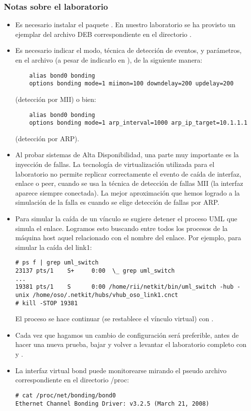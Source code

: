 \subsubsection{Notas sobre el laboratorio}
\begin{itemize}
	\item Es necesario instalar el paquete . En nuestro laboratorio se ha provisto un ejemplar del archivo DEB correspondiente en el directorio .
	\item Es necesario indicar el modo, técnica de detección de eventos, y parámetros, en el archivo  (a pesar de indicarlo en ), de la siguiente manera:
	\begin{lstlisting}
	alias bond0 bonding
	options bonding mode=1 miimon=100 downdelay=200 updelay=200
	\end{lstlisting}
(detección por MII) o bien:
	\begin{lstlisting}
	alias bond0 bonding
	options bonding mode=1 arp_interval=1000 arp_ip_target=10.1.1.1
	\end{lstlisting}
(detección por ARP).
	\item Al probar sistemas de Alta Disponibilidad, una parte muy importante es la inyección de fallas. La tecnología de virtualización utilizada para el laboratorio no permite replicar correctamente el evento de caída de interfaz, enlace o peer, cuando se usa la técnica de detección de fallas MII (la interfaz aparece siempre conectada). La mejor aproximación que hemos logrado a la simulación de la falla es cuando se elige detección de fallas por ARP.
	\item Para simular la caída de un vínculo se sugiere detener el proceso UML que simula el enlace. Logramos esto buscando entre todos los procesos  de la máquina host aquel relacionado con el nombre del enlace. Por ejemplo, para simular la caída del link1:
	\begin{lstlisting}
# ps f | grep uml_switch
23137 pts/1    S+     0:00  \_ grep uml_switch
...
19381 pts/1    S      0:00 /home/rii/netkit/bin/uml_switch -hub -unix /home/oso/.netkit/hubs/vhub_oso_link1.cnct
# kill -STOP 19381
\end{lstlisting}
	El proceso se hace continuar (se restablece el vínculo virtual) con .
	\item Cada vez que hagamos un cambio de configuración será preferible, antes de hacer una nueva prueba, bajar y volver a levantar el laboratorio completo con  y . 
	\item La interfaz virtual bond puede monitorearse mirando el pseudo archivo correspondiente en el directorio /proc:
\begin{lstlisting}
# cat /proc/net/bonding/bond0 
Ethernet Channel Bonding Driver: v3.2.5 (March 21, 2008)


\end{lstlisting}
\end{itemize}
